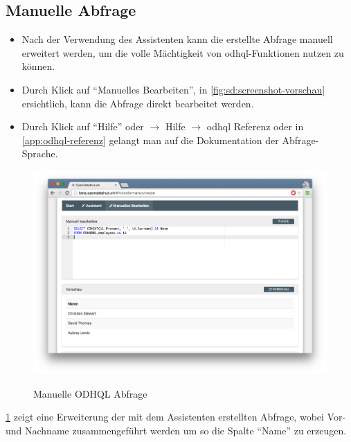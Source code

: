 \subsection{Manuelle Abfrage}

\begin{itemize}
\item Nach der Verwendung des Assistenten kann die erstellte Abfrage manuell erweitert werden, um die volle Mächtigkeit von \acs{odhql}-Funktionen nutzen zu können. 
\item Durch Klick auf ``Manuelles Bearbeiten'', in \cref{fig:sd:screenshot-vorschau} ersichtlich, kann die Abfrage direkt bearbeitet werden.
\item Durch Klick auf ``Hilfe'' oder  $\to$ Hilfe $\to$ \acs{odhql} Referenz oder in \vref{app:odhql-referenz} gelangt man auf die Dokumentation der Abfrage-Sprache.
\end{itemize}

\begin{figure}[H]
	\centering
	\includegraphics[width=\linewidth]{fig/screenshot-manuelles-bearbeiten}
	\label{fig:sd:screenshot-manuelles-bearbeiten}
	\caption{Manuelle ODHQL Abfrage}
\end{figure}

\cref{fig:sd:screenshot-manuelles-bearbeiten} zeigt eine Erweiterung der mit dem Assistenten erstellten Abfrage, wobei Vor- und Nachname zusammengeführt werden um so die Spalte ``Name'' zu erzeugen.
